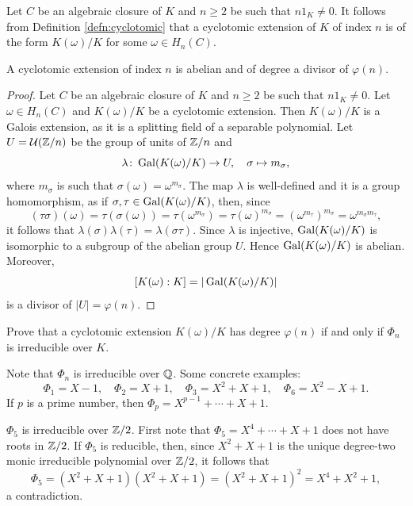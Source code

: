 Let $C$ be an algebraic closure of $K$ and $n\geq2$ be such that $n1_K\ne0$.  
It follows from Definition \ref{defn:cyclotomic} 
that a cyclotomic extension of $K$ of index $n$ is of the form 
$K(\omega)/K$ for some $\omega\in H_n(C)$. 

\begin{proposition}
    A cyclotomic extension of index $n$ is abelian and of degree a divisor of $\varphi(n)$. 
\end{proposition}

\begin{proof}
    Let $C$ be an algebraic closure of $K$ and $n\geq2$ be such that $n1_K\ne0$. 
    Let $\omega\in H_n(C)$ and $K(\omega)/K$ be a cyclotomic extension. Then $K(\omega)/K$
    is a Galois extension, as it is a splitting field of a separable polynomial. 
    Let $U=\mathcal{U}(\mathbb{Z}/n)$ be the group of units of $\mathbb{Z}/n$ and 
    \[
    \lambda\colon \operatorname{Gal}(K(\omega)/K)\to U,
    \quad
    \sigma\mapsto m_{\sigma},
    \]
    where $m_{\sigma}$ is such that $\sigma(\omega)=\omega^{m_{\sigma}}$. The map $\lambda$ is well-defined and
    it is a group homomorphism, as if $\sigma,\tau\in\operatorname{Gal}(K(\omega)/K)$, then, since 
    \[
        (\tau\sigma)(\omega)=\tau(\sigma(\omega))=\tau(\omega^{m_\sigma})=\tau(\omega)^{m_\sigma}=\left(\omega^{m_\tau}\right)^{m_\sigma}=\omega^{m_\sigma m_\tau},
    \]
    it follows that $\lambda(\sigma)\lambda(\tau)=\lambda(\sigma\tau)$. Since 
    $\lambda$ is injective, $\operatorname{Gal}(K(\omega)/K)$ is isomorphic to a subgroup 
    of the abelian group $U$. Hence $\operatorname{Gal}(K(\omega)/K)$ is abelian. Moreover, 
    \[
    [K(\omega):K]=|\operatorname{Gal}(K(\omega)/K)|
    \]
    is a divisor of $|U|=\varphi(n)$. 
\end{proof}

\begin{exercise}
    Prove that a cyclotomic extension $K(\omega)/K$ has degree $\varphi(n)$ if and only if 
    $\Phi_n$ is irreducible over $K$. 
\end{exercise}

Note that $\Phi_n$ is irreducible over $\mathbb{Q}$. Some concrete examples:
\[
\Phi_1=X-1,
\quad
\Phi_2=X+1,
\quad
\Phi_3=X^2+X+1,
\quad
\Phi_6=X^2-X+1.
\]
If $p$ is a prime number, then $\Phi_p=X^{p-1}+\cdots+X+1$. 

\begin{example}
    $\Phi_5$ is irreducible over $\mathbb{Z}/2$. First note that
    $\Phi_5=X^{4}+\cdots+X+1$ does not have roots in $\mathbb{Z}/2$. If 
    $\Phi_5$ is reducible, then, since
    $X^2+X+1$ is the unique degree-two 
    monic irreducible polynomial 
    over $\mathbb{Z}/2$, it follows that
    \[
    \Phi_5=(X^2+X+1)(X^2+X+1)=(X^2+X+1)^2=X^4+X^2+1,
    \]
    a contradiction.
\end{example}

